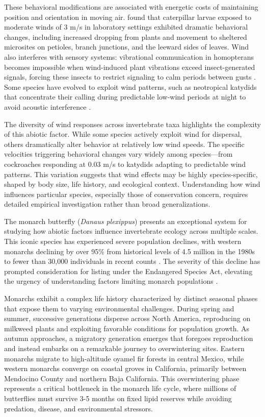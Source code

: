 These behavioral modifications are associated with energetic costs of maintaining position and orientation in moving air. \citet{leonardExposureWindAlters2016} found that caterpillar larvae exposed to moderate winds of 3 m/s in laboratory settings exhibited dramatic behavioral changes, including increased dropping from plants and movement to sheltered microsites on petioles, branch junctions, and the leeward sides of leaves. Wind also interferes with sensory systems: vibrational communication in homopterans becomes impossible when wind-induced plant vibrations exceed insect-generated signals, forcing these insects to restrict signaling to calm periods between gusts \citep{tishechkinVibrationalBackgroundNoise2013}. Some species have evolved to exploit wind patterns, such as neotropical katydids that concentrate their calling during predictable low-wind periods at night to avoid acoustic interference \citep{velillaGoneWindSignal2020}.

The diversity of wind responses across invertebrate taxa highlights the complexity of this abiotic factor. While some species actively exploit wind for dispersal, others dramatically alter behavior at relatively low wind speeds. The specific velocities triggering behavioral changes vary widely among species—from cockroaches responding at 0.03 m/s to katydids adapting to predictable wind patterns. This variation suggests that wind effects may be highly species-specific, shaped by body size, life history, and ecological context. Understanding how wind influences particular species, especially those of conservation concern, requires detailed empirical investigation rather than broad generalizations.

The monarch butterfly (\textit{Danaus plexippus}) presents an exceptional system for studying how abiotic factors influence invertebrate ecology across multiple scales. This iconic species has experienced severe population declines, with western monarchs declining by over 95\% from historical levels of 4.5 million in the 1980s to fewer than 30,000 individuals in recent counts \citep{schultzCitizenScienceMonitoring2017a, peltonWesternMonarchPopulation2019}. The severity of this decline has prompted consideration for listing under the Endangered Species Act, elevating the urgency of understanding factors limiting monarch populations \citep{croneWhyAreMonarch2019}.

Monarchs exhibit a complex life history characterized by distinct seasonal phases that expose them to varying environmental challenges. During spring and summer, successive generations disperse across North America, reproducing on milkweed plants and exploiting favorable conditions for population growth. As autumn approaches, a migratory generation emerges that foregoes reproduction and instead embarks on a remarkable journey to overwintering sites. Eastern monarchs migrate to high-altitude oyamel fir forests in central Mexico, while western monarchs converge on coastal groves in California, primarily between Mendocino County and northern Baja California. This overwintering phase represents a critical bottleneck in the monarch life cycle, where millions of butterflies must survive 3-5 months on fixed lipid reserves while avoiding predation, disease, and environmental stressors.

